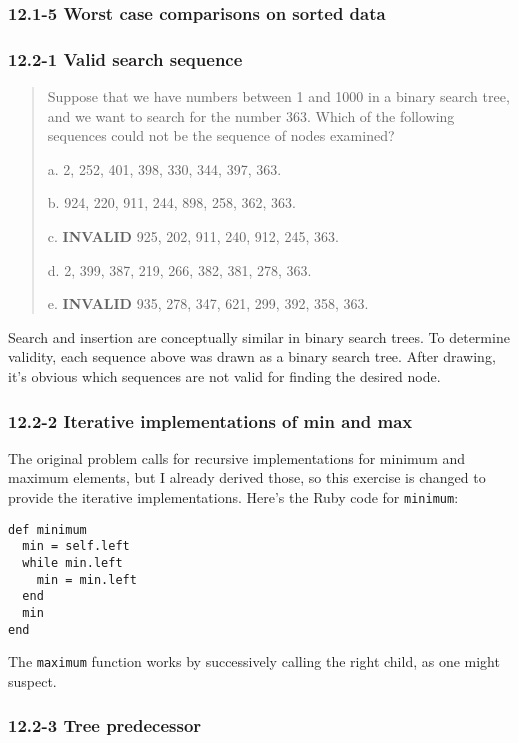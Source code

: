 \documentclass{article}
\begin{document}
\subsubsection{12.1-5 Worst case comparisons on sorted data}

\subsubsection{12.2-1 Valid search sequence}

\begin{quote}
Suppose that we have numbers between 1 and 1000 in a binary search tree, and we
want to search for the number 363. Which of the following sequences could not be
the sequence of nodes examined?

a. 2, 252, 401, 398, 330, 344, 397, 363.

b. 924, 220, 911, 244, 898, 258, 362, 363.

c. \textbf{INVALID} 925, 202, 911, 240, 912, 245, 363.

d. 2, 399, 387, 219, 266, 382, 381, 278, 363.

e. \textbf{INVALID} 935, 278, 347, 621, 299, 392, 358, 363.
\end{quote}

Search and insertion are conceptually similar in binary search
trees. To determine validity, each sequence above was drawn as
a binary search tree. After drawing, it's obvious which sequences
are not valid for finding the desired node.

\subsubsection{12.2-2 Iterative implementations of min and max}

The original problem calls for recursive implementations for minimum
and maximum elements, but I already derived those, so this exercise
is changed to provide the iterative implementations. Here's the
Ruby code for \texttt{minimum}:

\begin{lstlisting}[frame=single]
def minimum
  min = self.left
  while min.left
    min = min.left
  end
  min
end
\end{lstlisting}

The \texttt{maximum} function works by successively calling the right
child, as one might suspect.

\subsubsection{12.2-3 Tree predecessor}
\end{document}

